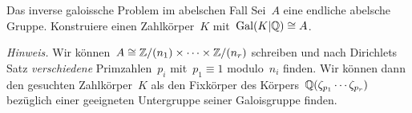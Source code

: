 \documentclass[entwurf]{uebblatt}
\begin{document}

\begin{aufgabe}{Das inverse galoissche Problem im abelschen Fall}
Sei~$A$ eine endliche abelsche Gruppe. Konstruiere einen Zahlkörper~$K$
mit~$\mathrm{Gal}(K|\mathbb{Q}) \cong A$.

{\tiny\emph{Hinweis.} Wir können~$A \cong \mathbb{Z}/(n_1) \times \cdots \times
\mathbb{Z}/(n_r)$ schreiben und nach Dirichlets Satz \emph{verschiedene}
Primzahlen~$p_i$ mit~$p_1 \equiv 1$ modulo~$n_i$ finden. Wir können dann den
gesuchten Zahlkörper~$K$ als den Fixkörper
des Körpers~$\mathbb{Q}(\zeta_{p_1}\cdots\zeta_{p_r})$ bezüglich einer geeigneten Untergruppe
seiner Galoisgruppe finden.\par}
\end{aufgabe}
\end{document}
